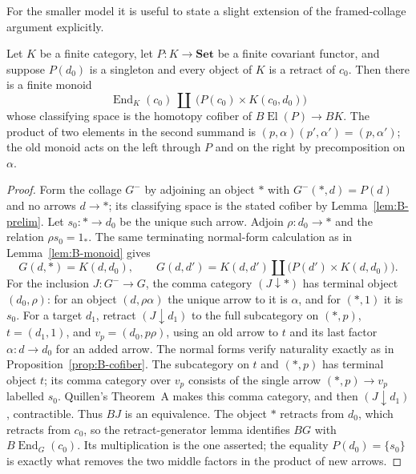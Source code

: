 For the smaller model it is useful to state a slight extension of the
framed-collage argument explicitly.
\begin{lemma}\label{lem:B-framed-collage}
Let $K$ be a finite category, let $P:K\to\mathbf{Set}$ be a finite
covariant functor, and suppose $P(d_0)$ is a singleton and every object
of $K$ is a retract of $c_0$.  Then there is a finite monoid
\[
 \operatorname{End}_K(c_0)\ \amalg\
       \big(P(c_0)\times K(c_0,d_0)\big)
\]
whose classifying space is the homotopy cofiber of
$B\operatorname{El}(P)\to BK$.  The product of two elements in the
second summand is $(p,\alpha)(p',\alpha')=(p,\alpha')$;
the old monoid acts on the left through $P$ and on the right by
precomposition on $\alpha$.
\end{lemma}
\begin{proof}
Form the collage $G^-$ by adjoining an object $*$ with
$G^-(*,d)=P(d)$ and no arrows $d\to *$; its classifying space is
the stated cofiber by Lemma~\ref{lem:B-prelim}.  Let $s_0:*\to d_0$
be the unique such arrow.  Adjoin $\rho:d_0\to *$ and the relation
$\rho s_0=1_*$.  The same terminating normal-form calculation as
in Lemma~\ref{lem:B-monoid} gives
\[
 G(d,*)=K(d,d_0),\qquad
 G(d,d')=K(d,d')\amalg\big(P(d')\times K(d,d_0)\big).
\]
For the inclusion $J:G^-\to G$, the comma category
$(J\downarrow *)$ has terminal object $(d_0,\rho)$: for an
object $(d,\rho\alpha)$ the unique arrow to it is $\alpha$,
and for $(*,1)$ it is $s_0$.
For a target $d_1$, retract $(J\downarrow d_1)$ to the full
subcategory on $(*,p)$, $t=(d_1,1)$, and
$v_p=(d_0,p\rho)$, using an old arrow to $t$ and its last factor
$\alpha:d\to d_0$ for an added arrow.  The normal forms verify
naturality exactly as in Proposition~\ref{prop:B-cofiber}.
The subcategory on $t$ and $(*,p)$ has terminal object $t$;
its comma category over $v_p$ consists of the single arrow
$(*,p)\to v_p$ labelled $s_0$.  Quillen's Theorem~A makes this
comma category, and then $(J\downarrow d_1)$, contractible.
Thus $BJ$ is an equivalence.  The object $*$ retracts from $d_0$,
which retracts from $c_0$, so the retract-generator lemma identifies
$BG$ with $B\operatorname{End}_G(c_0)$.  Its multiplication is the
one asserted; the equality $P(d_0)=\{s_0\}$ is exactly what
removes the two middle factors in the product of new arrows.
\end{proof}

